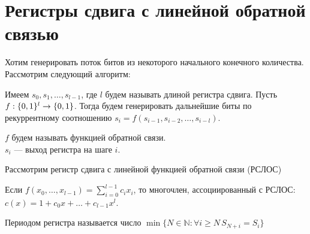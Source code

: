 
\section{Регистры сдвига с линейной обратной связью}

Хотим генерировать поток битов из некоторого начального конечного количества.
Рассмотрим следующий алгоритм:

\begin{algorithm}
Имеем $s_0, s_1, \ldots, s_{l-1}$, где $l$ будем называть длиной регистра
сдвига. Пусть $f: \{0,1\}^l \to \{0,1\}$. Тогда будем генерировать дальнейшие биты
по рекуррентному соотношению $s_i = f(s_{i-1}, s_{i-2}, \ldots, s_{i-l})$.

$f$ будем называть функцией обратной связи.\\
$s_i$ --- выход регистра на шаге $i$.
\end{algorithm}

Рассмотрим регистр сдвига с линейной функцией обратной связи (РСЛОС)

\begin{definition}
Если $f(x_0, \ldots, x_{l-1}) = \sum\limits_{i=0}^{l-1} c_i x_i$, то
многочлен, ассоциированный с РСЛОС: $c(x) = 1 + c_0 x + \ldots + c_{l-1} x^l$.
\end{definition}

\begin{definition}
Периодом регистра называется число
$\min \{N \in \mathbb{N} \colon \forall i \ge N \, S_{N+i} = S_i\}$
\end{definition}

